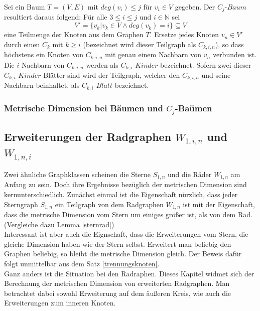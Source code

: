 \begin{defi}
Sei ein Baum $T=(V,E)$ mit $deg(v_i)\leq j$ für $v_i \in V$ gegeben. Der $C_j$-$Baum$ resultiert daraus folgend: 
Für alle $3 \leq i \leq j$ und $i \in \mathbb{N}$ sei $$V'=\{v_k|v_k \in V \wedge deg(v_k)=i\}\subseteq V$$ eine Teilmenge der Knoten aus dem Graphen $T$. Ersetze jedes Knoten $v_n \in V'$ durch einen $C_k$ mit $k \geq i$ (bezeichnet wird dieser Teilgraph als \emph{$C_{k,i,n}$}), so dass höchstens ein Knoten von $C_{k,i,n}$ mit genau einem Nachbarn von $v_n$ verbunden ist. Die $i$ Nachbarn von $C_{k,i,n}$ werden als \emph{$C_{k,i}$-$Kinder$} bezeichnet. Sofern zwei dieser $C_{k,i}$-$Kinder$ Blätter sind wird der Teilgraph, welcher den $C_{k,i,n}$ und seine Nachbarn beinhaltet, als \emph{$C_{k,i}$-$Blatt$} bezeichnet.
\end{defi}

\clearpage
\begin{satz}
\end{satz}

\subsubsection{Metrische Dimension bei Bäumen und $C_j$-Baümen}
\subsection{Erweiterungen der Radgraphen $W_{1,i,n}$ und $W_{1,n,i}$}
Zwei ähnliche Graphklassen scheinen die Sterne $S_{1,n}$ und die Räder $W_{1,n}$ am Anfang zu sein. Doch ihre Ergebnisse bezüglich der metrischen Dimension sind kernunterschiedlich. Zunächst einmal ist die Eigenschaft nürzlich, dass jeder Sterngraph $S_{1,n}$ ein Teilgraph von dem Radgraphen $W_{1,n}$ ist mit der Eigenschaft, dass die metrische Dimension vom Stern um einiges größer ist, als von dem Rad. (Vergleiche dazu Lemma \ref{sternrad})\\
Interessant ist aber auch die Eignschaft, dass die Erweiterungen vom Stern, die gleiche Dimension haben wie der Stern selbst. Erweitert man beliebig den Graphen beliebig, so bleibt die metrische Dimension gleich. Der Beweis dafür folgt unmittelbar aus dem Satz \ref{trennungsknoten}.\\
Ganz anders ist die Situation bei den Radraphen. Dieses Kapitel widmet sich der Berechnung der metrischen Dimension von erweiterten Radgraphen. Man betrachtet dabei sowohl Erweiterung auf dem äußeren Kreis, wie auch die Erweiterungen zum inneren Knoten.\\

